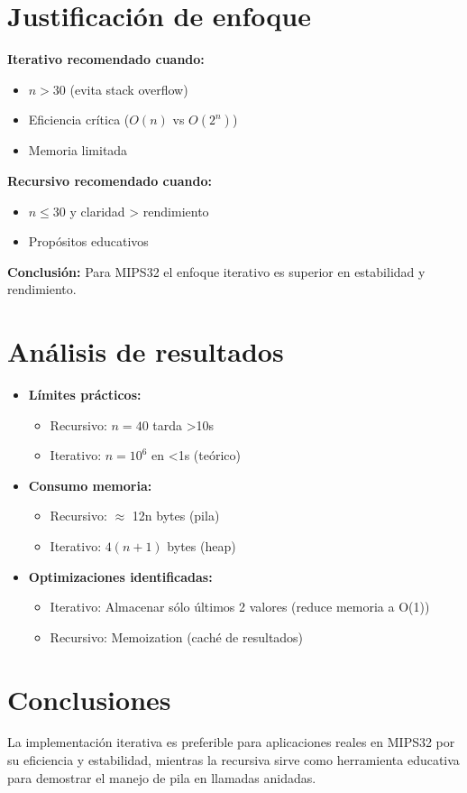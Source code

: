 \documentclass[a4paper, 12pt]{article}
\begin{document}
\section{Justificación de enfoque}
\textbf{Iterativo recomendado cuando:}
\begin{itemize}
    \item $n > 30$ (evita stack overflow)
    \item Eficiencia crítica ($O(n)$ vs $O(2^n)$)
    \item Memoria limitada
\end{itemize}

\textbf{Recursivo recomendado cuando:}
\begin{itemize}
    \item $n \leq 30$ y claridad > rendimiento
    \item Propósitos educativos
\end{itemize}

\textbf{Conclusión:} Para MIPS32 el enfoque iterativo es superior en estabilidad y rendimiento.

\section{Análisis de resultados}
\begin{itemize}
    \item \textbf{Límites prácticos:}
    \begin{itemize}
        \item Recursivo: $n=40$ tarda >10s
        \item Iterativo: $n=10^6$ en <1s (teórico)
    \end{itemize}
    \item \textbf{Consumo memoria:}
    \begin{itemize}
        \item Recursivo: $\approx$ 12n bytes (pila)
        \item Iterativo: $4(n+1)$ bytes (heap)
    \end{itemize}
    \item \textbf{Optimizaciones identificadas:}
    \begin{itemize}
        \item Iterativo: Almacenar sólo últimos 2 valores (reduce memoria a O(1))
        \item Recursivo: Memoization (caché de resultados)
    \end{itemize}
\end{itemize}

\section*{Conclusiones}
La implementación iterativa es preferible para aplicaciones reales en MIPS32 por su eficiencia y estabilidad, mientras la recursiva sirve como herramienta educativa para demostrar el manejo de pila en llamadas anidadas.
\end{document}
